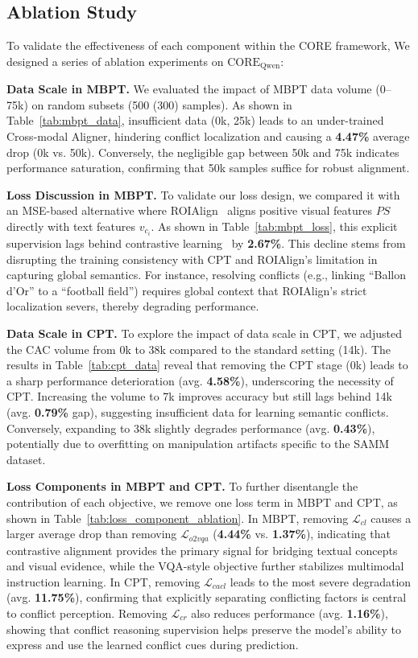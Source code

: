 \documentclass{article}
\theoremstyle{plain}
\theoremstyle{definition}
\theoremstyle{remark}
\begin{document}
\subsection{Ablation Study}
To validate the effectiveness of each component within the CORE framework, 
We designed a series of ablation experiments on $\text{CORE}_\text{Qwen}$:

\noindent\textbf{Data Scale in MBPT.} We evaluated the impact of MBPT data volume (0--75k) on random subsets (500 (300) samples). As shown in Table~\ref{tab:mbpt_data}, insufficient data (0k, 25k) leads to an under-trained Cross-modal Aligner, hindering conflict localization and causing a \textbf{4.47\%} average drop (0k vs. 50k). Conversely, the negligible gap between 50k and 75k indicates performance saturation, confirming that 50k samples suffice for robust alignment.


\noindent\textbf{Loss Discussion in MBPT.} To validate our loss design, we compared it with an MSE-based alternative where ROIAlign~\cite{rcnn} aligns positive visual features $PS$ directly with text features $v_{c_i}$. As shown in Table~\ref{tab:mbpt_loss}, this explicit supervision lags behind contrastive learning~\cite{moco} by \textbf{2.67\%}. This decline stems from disrupting the training consistency with CPT and ROIAlign's limitation in capturing global semantics. For instance, resolving conflicts (e.g., linking ``Ballon d'Or'' to a ``football field'') requires global context that ROIAlign's strict localization severs, thereby degrading performance.

\noindent\textbf{Data Scale in CPT.}
To explore the impact of data scale in CPT, we adjusted the CAC volume from 0k to 38k compared to the standard setting (14k). The results in Table~\ref{tab:cpt_data} reveal that removing the CPT stage (0k) leads to a sharp performance deterioration (avg. \textbf{4.58\%}), underscoring the necessity of CPT. Increasing the volume to 7k improves accuracy but still lags behind 14k (avg. \textbf{0.79\%} gap), suggesting insufficient data for learning semantic conflicts. Conversely, expanding to 38k slightly degrades performance (avg. \textbf{0.43\%}), potentially due to overfitting on manipulation artifacts specific to the SAMM dataset.


\noindent\textbf{Loss Components in MBPT and CPT.}
To further disentangle the contribution of each objective, we remove one loss term in MBPT and CPT, as shown in Table~\ref{tab:loss_component_ablation}. In MBPT, removing $\mathcal{L}_{cl}$ causes a larger average drop than removing $\mathcal{L}_{o2vqa}$ (\textbf{4.44\%} vs. \textbf{1.37\%}), indicating that contrastive alignment provides the primary signal for bridging textual concepts and visual evidence, while the VQA-style objective further stabilizes multimodal instruction learning. In CPT, removing $\mathcal{L}_{cacl}$ leads to the most severe degradation (avg. \textbf{11.75\%}), confirming that explicitly separating conflicting factors is central to conflict perception. Removing $\mathcal{L}_{cr}$ also reduces performance (avg. \textbf{1.16\%}), showing that conflict reasoning supervision helps preserve the model's ability to express and use the learned conflict cues during prediction.
\end{document}
